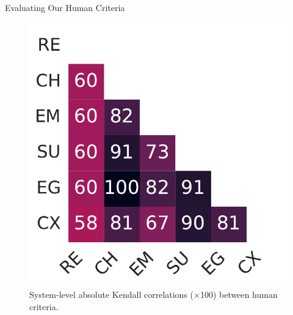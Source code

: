 \begin{frame}{Evaluating Our Human Criteria}
\begin{figure}[h]
\begin{minipage}{0.45\columnwidth}
{            \includegraphics[width=\columnwidth]{pictures/criteria_system_kendall.pdf}
            \caption{System-level absolute Kendall correlations ($\times$100) between human criteria.}
            \label{fig:system_level_human_correlations}
        }
    \end{minipage}
    \end{figure}
\end{frame}

